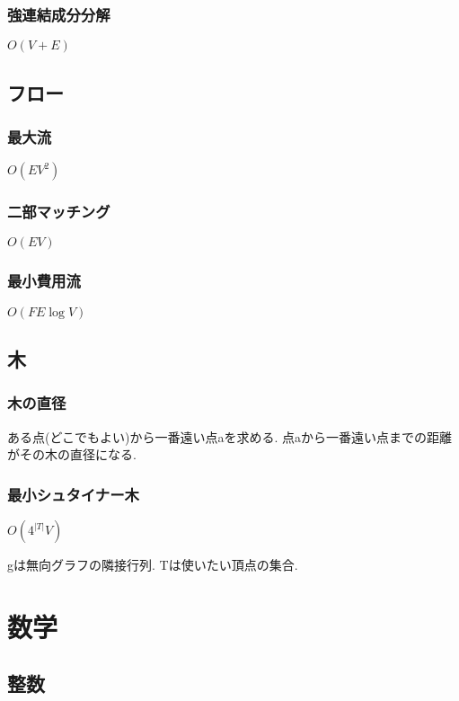 \documentclass[9pt,twocolumn,a4paper,landscape]{extarticle}
\begin{document}
\subsubsection{強連結成分分解}
$O(V+E)$\par


\subsection{フロー}
\subsubsection{最大流}
$O(EV^2)$\par


\subsubsection{二部マッチング}
$O(EV)$\par


\subsubsection{最小費用流}
$O(FE\log V)$\par


\subsection{木}
\subsubsection{木の直径}
ある点(どこでもよい)から一番遠い点aを求める. 点aから一番遠い点までの距離がその木の直径になる.\par
\subsubsection{最小シュタイナー木}
$O(4^{|T|}V)$ \par
gは無向グラフの隣接行列. Tは使いたい頂点の集合.\par


\section{数学}
\subsection{整数}
\end{document}
